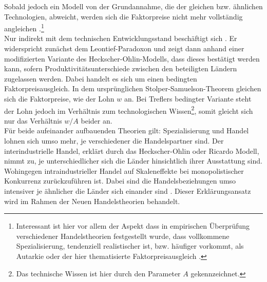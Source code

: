 Sobald jedoch ein Modell von der Grundannahme, die der gleichen bzw. ähnlichen Technologien, abweicht, werden sich die Faktorpreise nicht mehr vollst{\"a}ndig angleichen \citep{Jones.1970,Davis.2001}.\footnote{Interessant ist hier vor allem der Aspekt dass in empirischen {\"U}berpr{\"u}fung verschiedener Handelstheorien festgestellt wurde, dass vollkommene Spezialisierung, tendenziell realistischer ist, bzw. h{\"a}ufiger vorkommt, als Autarkie oder der hier thematisierte Faktorpreisausgleich \citep{Cunat.2001}.}\\


Nur indirekt mit dem technischen Entwicklungsstand beschäftigt sich \citet{Trefler.1993}. Er widerspricht zunächst dem Leontief-Paradoxon und zeigt dann anhand einer modifizierten Variante des Heckscher-Ohlin-Modells, dass dieses best{\"a}tigt werden kann, sofern Produktivit{\"a}tsunterschiede zwischen den beteiligten L{\"a}ndern zugelassen werden. Dabei handelt es sich um einen bedingten Faktorpreisausgleich. In dem ursprünglichen Stolper-Samuelson-Theorem gleichen sich die Faktorpreise, wie der Lohn $w$ an. Bei Treflers bedingter Variante steht der Lohn jedoch im Verh{\"a}ltnis zum technologischen Wissen\footnote{Das technische Wissen ist hier durch den Parameter $A$ gekennzeichnet.}, somit gleicht sich nur das Verh{\"a}ltnis $w/A$ beider an.\bigskip\\


F{\"u}r beide aufeinander aufbauenden Theorien gilt: Spezialisierung und Handel lohnen sich umso mehr, je verschiedener die Handelspartner sind. Der interindustrielle Handel, erkl{\"a}rt durch das Heckscher-Ohlin oder Ricardo Modell, nimmt zu, je unterschiedlicher sich die L{\"a}nder hinsichtlich ihrer Ausstattung sind. Wohingegen intraindustrieller Handel auf Skaleneffekte bei monopolistischer Konkurrenz zur{\"u}ckzuf{\"u}hren ist. Dabei sind die Handelsbeziehungen umso intensiver je {\"a}hnlicher die L{\"a}nder sich einander sind \citep{Dosi.1993}. Dieser Erklärungsansatz wird im Rahmen der Neuen Handelstheorien behandelt.


